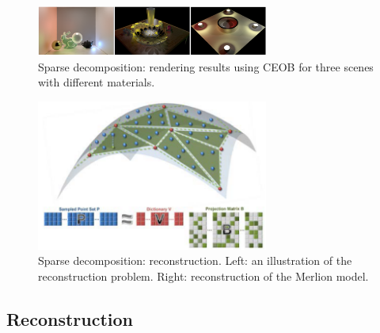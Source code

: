 \begin{figure}[ht]
  \centering
  \includegraphics[width=3in]{images/rendering_learning}
  \caption{Sparse decomposition: rendering\cite{miandji2013learning} results using CEOB for three scenes with different materials.}
\end{figure}

\begin{figure}[ht]
  \centering
  \includegraphics[width=3in]{images/reconstruction_learning}
  \caption{Sparse decomposition: reconstruction\cite{}. Left: an illustration of the reconstruction problem. Right: reconstruction of the Merlion model.}
\end{figure}



\subsection{Reconstruction}
